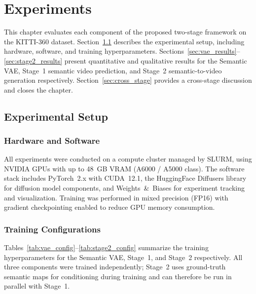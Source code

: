 \chapter{Experiments}
\label{ch:experiments}

This chapter evaluates each component of the proposed two-stage framework on the KITTI-360 dataset. Section~\ref{sec:implementation} describes the experimental setup, including hardware, software, and training hyperparameters. Sections~\ref{sec:vae_results}--\ref{sec:stage2_results} present quantitative and qualitative results for the Semantic VAE, Stage~1 semantic video prediction, and Stage~2 semantic-to-video generation respectively. Section~\ref{sec:cross_stage} provides a cross-stage discussion and closes the chapter.

\FloatBarrier
\section{Experimental Setup}
\label{sec:implementation}

\subsection{Hardware and Software}
\label{subsec:hardware}

All experiments were conducted on a compute cluster managed by SLURM, using NVIDIA GPUs with up to 48~GB VRAM (A6000 / A5000 class). The software stack includes PyTorch~2.x with CUDA~12.1, the HuggingFace Diffusers library~\cite{von-platen-etal-2022-diffusers} for diffusion model components, and Weights~\&~Biases for experiment tracking and visualization. Training was performed in mixed precision (FP16) with gradient checkpointing enabled to reduce GPU memory consumption.

\subsection{Training Configurations}
\label{subsec:training_configs}

Tables~\ref{tab:vae_config}--\ref{tab:stage2_config} summarize the training hyperparameters for the Semantic VAE, Stage~1, and Stage~2 respectively. All three components were trained independently; Stage~2 uses ground-truth semantic maps for conditioning during training and can therefore be run in parallel with Stage~1.

